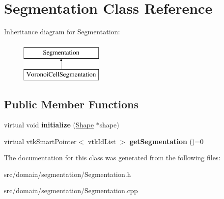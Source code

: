 \hypertarget{class_segmentation}{}\section{Segmentation Class Reference}
\label{class_segmentation}
Inheritance diagram for Segmentation\+:\begin{figure}[H]
\begin{center}
\leavevmode
\includegraphics[height=2.000000cm]{class_segmentation}
\end{center}
\end{figure}
\subsection*{Public Member Functions}
\begin{DoxyCompactItemize}
\item 
\hypertarget{class_segmentation_aa5b36a2eb578b28ba38e7fa419d36657}{}virtual void {\bfseries initialize} (\hyperlink{class_shape}{Shape} $\ast$shape)\label{class_segmentation_aa5b36a2eb578b28ba38e7fa419d36657}

\item 
\hypertarget{class_segmentation_ad8f544325cba3ec408378016ebeb8413}{}virtual vtk\+Smart\+Pointer$<$ vtk\+Id\+List $>$ {\bfseries get\+Segmentation} ()=0\label{class_segmentation_ad8f544325cba3ec408378016ebeb8413}

\end{DoxyCompactItemize}


The documentation for this class was generated from the following files\+:\begin{DoxyCompactItemize}
\item 
src/domain/segmentation/Segmentation.\+h\item 
src/domain/segmentation/Segmentation.\+cpp\end{DoxyCompactItemize}
